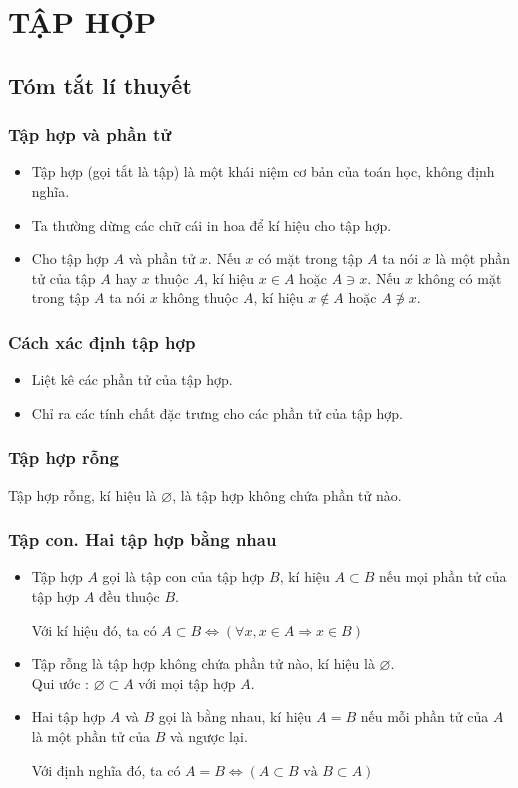 \section{TẬP HỢP}
\subsection{Tóm tắt lí thuyết}
\subsubsection{Tập hợp và phần tử}
\begin{itemize}
	\item Tập hợp (gọi tắt là tập) là một khái niệm cơ bản của toán học, không định nghĩa.
	\item Ta thường dừng các chữ cái in hoa để kí hiệu cho tập hợp. 
	\item Cho tập hợp $A$ và phần tử $x$. Nếu $x$ có mặt trong tập $A$ ta nói $x$ là một phần tử của tập $A$ hay $x$ thuộc $A$, kí hiệu $x\in A$ hoặc $A\ni x$. Nếu $x$ không có mặt trong tập $A$ ta nói $x$ không thuộc $A$, kí hiệu $x\notin A$ hoặc $A\not\ni x$.

\end{itemize}

\subsubsection{Cách xác định tập hợp}
\begin{itemize}
\item Liệt kê các phần tử của tập hợp.
\item Chỉ ra các tính chất đặc trưng cho các phần tử của tập hợp.
\end{itemize}
\subsubsection{Tập hợp rỗng}
\begin{dn}
Tập hợp rỗng, kí hiệu là $\varnothing$, là tập hợp không chứa phần tử nào.
\end{dn}
\subsubsection{Tập con. Hai tập hợp bằng nhau}
\hfill
	\begin{itemize}
		\item Tập hợp $A$ gọi là tập con của tập hợp $B$, kí hiệu $A\subset B$ nếu mọi phần tử của tập hợp $A$ đều thuộc $B$. 
		
		Với kí hiệu đó, ta có $A\subset B\Leftrightarrow \left(\forall x, x\in A\Rightarrow x\in B\right)$
		\item Tập rỗng là tập hợp không chứa phần tử nào, kí hiệu là $\varnothing$.\\
		Qui ước : $\varnothing \subset A$ với mọi tập hợp $A$.
		\item  Hai tập hợp $A$ và $B$ gọi là bằng nhau, kí hiệu $A=B$ nếu mỗi phần tử của $A$ là một phần tử của $B$ và ngược lại.
		
		Với định nghĩa đó, ta có $A=B\Leftrightarrow \left(A\subset B\text{ và }B\subset A \right)$ 
	\end{itemize}
